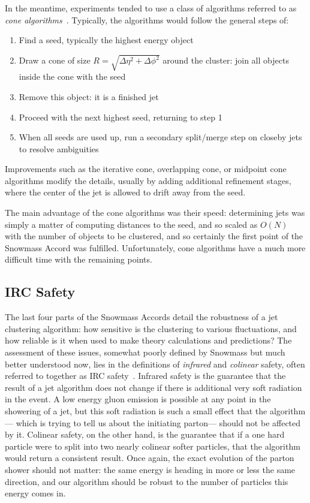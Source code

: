 In the meantime, experiments tended to use a class of algorithms referred to as \textit{cone algorithms}~\cite{Jetography}. Typically, the algorithms would follow the general steps of:
%
\begin{enumerate}
\item Find a seed, typically the highest energy object
\item Draw a cone of size $R = \sqrt{\Delta \eta^2 + \Delta \phi^2}$ around the cluster: join all objects inside the cone with the seed
\item Remove this object: it is a finished jet
\item Proceed with the next highest seed, returning to step 1
\item When all seeds are used up, run a secondary split/merge step on closeby jets to resolve ambiguities
\end{enumerate}
%
Improvements such as the iterative cone,  overlapping cone, or midpoint cone algorithms modify the details, usually by adding additional refinement stages, where the center of the jet is allowed to drift away from the seed.

The main advantage of the cone algorithms was their speed: determining jets was simply a matter of computing distances to the seed, and so scaled as $O(N)$ with the number of objects to be clustered, and so certainly the first point of the Snowmass Accord was fulfilled. Unfortunately, cone algorithms have a much more difficult time with the remaining points.

\subsection{IRC Safety}

The last four parts of the Snowmass Accords detail the robustness of a jet clustering algorithm: how sensitive is the clustering to various fluctuations, and how reliable is it when used to make theory calculations and predictions? The assessment of these issues, somewhat poorly defined by Snowmass but much better understood now, lies in the definitions of \textit{infrared} and \textit{colinear} safety, often referred to together as IRC safety~\cite{Jetography}. Infrared safety is the guarantee that the result of a jet algorithm does not change if there is additional very soft radiation in the event. A low energy gluon emission is possible at any point in the showering of a jet, but this soft radiation is such a small effect that the algorithm--- which is trying to tell us about the initiating parton--- should not be affected by it. Colinear safety, on the other hand, is the guarantee that if a one hard particle were to split into two nearly colinear softer particles, that the algorithm would return a consistent result. Once again, the exact evolution of the parton shower should not matter: the same energy is heading in more or less the same direction, and our algorithm should be robust to the number of particles this energy comes in.

